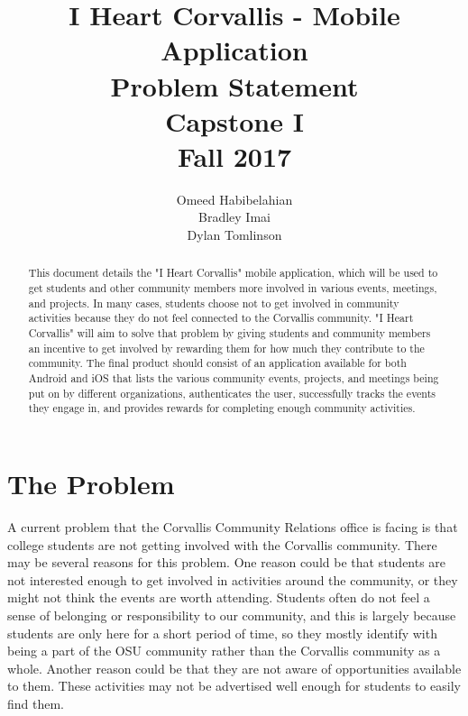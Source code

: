 \documentclass[draftclsnofoot, onecolumn, 10pt, compsoc]{IEEEtran}
\title{\textbf{I Heart Corvallis - Mobile Application\\Problem Statement}\\Capstone I\\Fall 2017}
\author{Omeed Habibelahian\\Bradley Imai\\Dylan Tomlinson}
\begin{document}
	\maketitle
	\begin{abstract}
		This document details the "I Heart Corvallis" mobile application, which will be used to get students and other 
		community members more involved in various events, meetings, and projects. In many cases, students choose 
		not to get involved in community activities because they do not feel connected to the Corvallis community. "I Heart 
		Corvallis" will aim to solve that problem by giving students and community members an incentive to get involved by 
		rewarding them for how much they contribute to the community. The final product should consist of an application 
		available for both Android and iOS that lists the various community events, projects, and meetings being put on by 
		different organizations, authenticates the user, successfully tracks the events they engage in, and provides rewards 
		for completing enough community activities.
	\end{abstract}
	\newpage
	
	\section{The Problem}
		A current problem that the Corvallis Community Relations office is facing is that college students are not getting 
		involved with the Corvallis community. There may be several reasons for this problem. One reason could be that 
		students are not interested enough to get involved in activities around the community, or they might not think the 
		events are worth attending. Students often do not feel a sense of belonging or responsibility to our community, and 
		this is largely because students are only here for a short period of time, so they mostly identify with being a part of the 
		OSU community rather than the Corvallis community as a whole. Another reason could be that they are not aware of 
		opportunities available to them. These activities may not be advertised well enough for students to easily find them.
	
\end{document}
